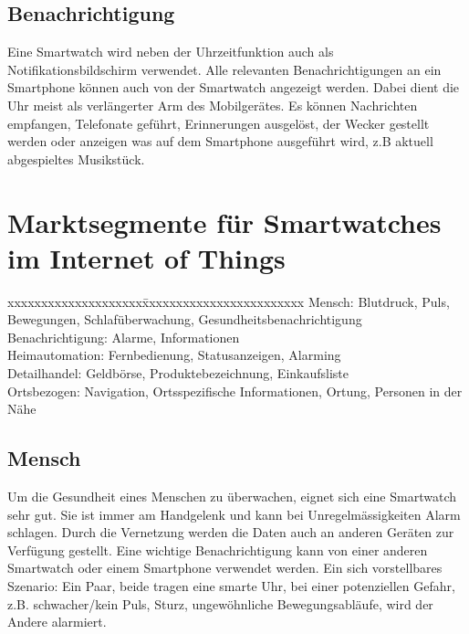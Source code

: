 \subsection{Benachrichtigung}
Eine Smartwatch wird neben der Uhrzeitfunktion auch als Notifikationsbildschirm verwendet. Alle relevanten Benachrichtigungen an ein Smartphone können auch von der Smartwatch angezeigt werden. Dabei dient die Uhr meist als verlängerter Arm des Mobilgerätes. Es können Nachrichten empfangen, Telefonate geführt, Erinnerungen ausgelöst, der Wecker gestellt werden oder anzeigen was auf dem Smartphone ausgeführt wird, z.B aktuell abgespieltes Musikstück.

\section{Marktsegmente für Smartwatches im Internet of Things}
\begin{tabbing}
xxxxxxxxxxxxxxxxxxxx\=xxxxxxxxxxxxxxxxxxxxxxxx	\kill
Mensch:		        \> Blutdruck, Puls, Bewegungen, Schlafüberwachung, Gesundheitsbenachrichtigung \\
Benachrichtigung:	\> Alarme, Informationen \\
Heimautomation:	  \> Fernbedienung, Statusanzeigen, Alarming \\
Detailhandel:		  \> Geldbörse, Produktebezeichnung, Einkaufsliste \\
Ortsbezogen:		  \> Navigation, Ortsspezifische Informationen, Ortung, Personen in der Nähe \\
\end{tabbing}

\subsection{Mensch}
Um die Gesundheit eines Menschen zu überwachen, eignet sich eine Smartwatch sehr gut. Sie ist immer am Handgelenk und kann bei Unregelmässigkeiten Alarm schlagen. Durch die Vernetzung werden die Daten auch an anderen Geräten zur Verfügung gestellt. Eine wichtige Benachrichtigung kann von einer anderen Smartwatch oder einem Smartphone verwendet werden. Ein sich vorstellbares Szenario: Ein Paar, beide tragen eine smarte Uhr, bei einer potenziellen Gefahr, z.B. schwacher/kein Puls, Sturz, ungewöhnliche Bewegungsabläufe, wird der Andere alarmiert.

